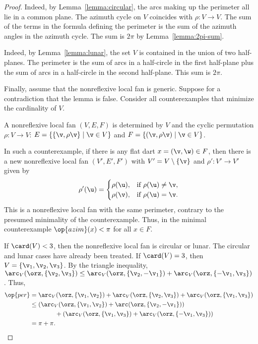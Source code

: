 \begin{proof} 
  Indeed, by Lemma~\ref{lemma:circular},
the arcs making up the perimeter all lie in a common plane.  The
azimuth cycle on $V$ coincides with $\rho:V\to V$.  The sum of the
terms in the formula defining the perimeter is the sum of the
azimuth angles in the azimuth cycle.  The sum is $2\pi$ by
Lemma~\ref{lemma:2pi-sum}.


  Indeed, by Lemma~\ref{lemma:lunar}, the
set $V$ is contained in the union of two half-planes.  The perimeter
is the sum of arcs in a half-circle in the first half-plane plus the
sum of arcs in a half-circle in the second half-plane. This sum is
$2\pi$.

Finally, assume that the nonreflexive local fan is generic.  Suppose for a
contradiction that the lemma is false.  Consider all counterexamples
that minimize the cardinality of $V$.  

A nonreflexive local fan $(V,E,F)$ is determined by $V$ and the cyclic
permutation $\rho:V\to V$: $E=\{\{\v,\rho \v\}\mid \v\in V\}$ and $F
= \{(\v,\rho \v)\mid \v\in V\}$.

In such a counterexample, if there is any flat dart $x=(\v,\w)\in F$,
then there is a new nonreflexive local fan $(V',E',F')$ with $V' =
V\setminus\{\v\}$ and $\rho':V'\to V'$ given by
\[ 
\rho'(\u) = \begin{cases}
\rho(\u), & \text{if } \rho(\u)\ne \v,\\
\rho(\v), & \text{if }\rho(\u) = \v.\\
\end{cases}
\] 
This is a nonreflexive local fan with the same perimeter, contrary to the presumed
minimality of the counterexample.  Thus, in the minimal counterexample
$\op{azim}(x) <\pi$ for all $x\in F$.

If $\card(V) <3$, then the nonreflexive local fan is circular or lunar.  The
circular and lunar cases have 
already been treated.  If $\card(V)=3$, then $V=\{\v_1,\v_2,\v_3\}$.
By the triangle inequality, $\arc_V(\orz,\{\v_2,\v_3\}) \le
\arc_V(\orz,\{\v_2,-\v_1\})+\arc_V(\orz,\{-\v_1,\v_3\})$.  Thus,
\begin{align*}
  \op{per} &=\arc_V(\orz,\{\v_1,\v_2\}) 
  + \arc_V(\orz,\{\v_2,\v_3\}) 
  + \arc_V(\orz,\{\v_1,\v_3\})\\
  &\le(\arc_V(\orz,\{\v_1,\v_2\})+\arc(\orz,\{\v_2,-\v_1\}))
  \\&\qquad\qquad+(\arc_V(\orz,\{\v_1,\v_3\})
+\arc_V(\orz,\{-\v_1,\v_3\})) \\
  &= \pi+\pi.
\end{align*}


\end{proof}
